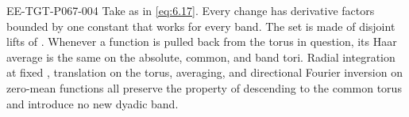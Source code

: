 \begin{lemma}\label{lem:6.2}
\begin{EESegment}{EE-TGT-P067-004}
Take  as in \eqref{eq:6.17}. Every change  has derivative factors bounded by one constant that works for every band. The set  is made of  disjoint lifts of . Whenever a function is pulled back from the torus in question, its Haar average is the same on the absolute, common, and band tori. Radial integration at fixed , translation on the torus, averaging, and directional Fourier inversion on zero-mean functions all preserve the property of descending to the common torus and introduce no new dyadic band.
\end{EESegment}
\end{lemma}

